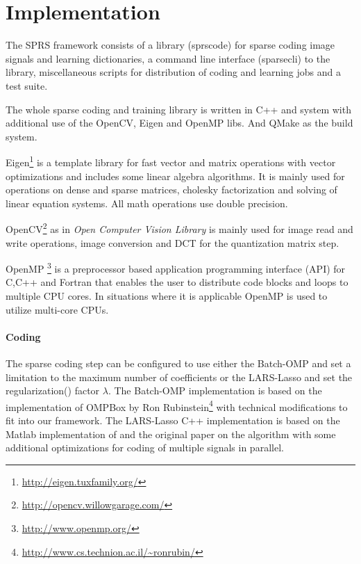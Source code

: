 

\section{Implementation}
The SPRS framework consists of a library (sprscode) for sparse coding image
signals and learning dictionaries, a command line interface (sparsecli) to the
library, miscellaneous scripts for distribution of coding and learning jobs
and a test suite.

The whole sparse coding and training library is written in C++ and system with
additional use of the OpenCV, Eigen and OpenMP libs. And QMake as the build
system. 

Eigen\footnote{\url{http://eigen.tuxfamily.org/}}
is a template library for fast vector and matrix operations with vector
optimizations and includes some linear algebra algorithms. It is mainly used for
operations on dense and sparse matrices, cholesky factorization and solving of
linear equation systems. All math operations use double precision. 

OpenCV\footnote{\url{http://opencv.willowgarage.com/}} as
in \emph{Open Computer Vision Library} is mainly used for
image read and write operations, image conversion and DCT for the
quantization matrix step. 

OpenMP \footnote{\url{http://www.openmp.org/}} is a preprocessor
based application programming interface (API) for C,C++ and Fortran that enables
the user to distribute code blocks and loops to multiple CPU cores. In
situations where it is applicable OpenMP is used to utilize multi-core CPUs. 



\paragraph{Coding}
The sparse coding step can be configured to use either the Batch-OMP and 
set a limitation to the maximum number of coefficients or the LARS-Lasso 
and set the regularization() factor $\lambda$.
The Batch-OMP implementation is based on the implementation
of OMPBox by Ron
 Rubinstein\footnote{\url{http://www.cs.technion.ac.il/~ronrubin/}} with
technical modifications to fit into our
framework. The LARS-Lasso C++ implementation is based on the Matlab
implementation of\cite{Strand2005} and the original
paper\cite{Efron2004} on the algorithm with some additional optimizations
for coding of multiple signals in parallel. 

